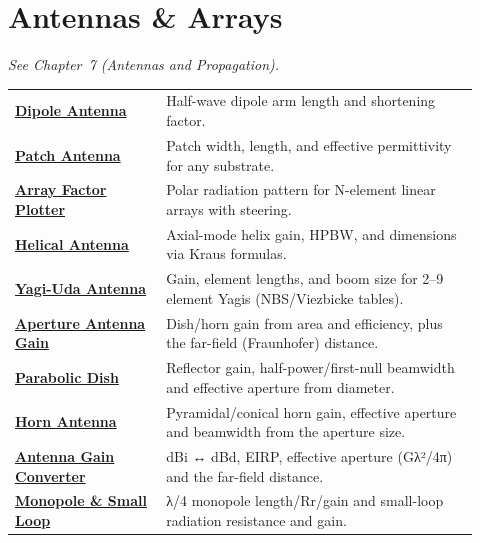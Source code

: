 \section*{Antennas \& Arrays}
\noindent\emph{See Chapter~7 (Antennas and Propagation).}
\begin{longtable}{>{\raggedright\arraybackslash}p{0.30\linewidth}>{\raggedright\arraybackslash}p{0.62\linewidth}}
\hline
\href{https://rftoolbox.ca/Dipole.html}{\textbf{Dipole Antenna}} & Half-wave dipole arm length and shortening factor. \\
\href{https://rftoolbox.ca/PatchAntenna.html}{\textbf{Patch Antenna}} & Patch width, length, and effective permittivity for any substrate. \\
\href{https://rftoolbox.ca/ArrayFactor.html}{\textbf{Array Factor Plotter}} & Polar radiation pattern for N-element linear arrays with steering. \\
\href{https://rftoolbox.ca/HelicalAntenna.html}{\textbf{Helical Antenna}} & Axial-mode helix gain, HPBW, and dimensions via Kraus formulas. \\
\href{https://rftoolbox.ca/YagiAntenna.html}{\textbf{Yagi-Uda Antenna}} & Gain, element lengths, and boom size for 2–9 element Yagis (NBS/Viezbicke tables). \\
\href{https://rftoolbox.ca/ApertureAntenna.html}{\textbf{Aperture Antenna Gain}} & Dish/horn gain from area and efficiency, plus the far-field (Fraunhofer) distance. \\
\href{https://rftoolbox.ca/ParabolicDish.html}{\textbf{Parabolic Dish}} & Reflector gain, half-power/first-null beamwidth and effective aperture from diameter. \\
\href{https://rftoolbox.ca/HornAntenna.html}{\textbf{Horn Antenna}} & Pyramidal/conical horn gain, effective aperture and beamwidth from the aperture size. \\
\href{https://rftoolbox.ca/AntennaGainConverter.html}{\textbf{Antenna Gain Converter}} & dBi ↔ dBd, EIRP, effective aperture (Gλ²/4π) and the far-field distance. \\
\href{https://rftoolbox.ca/MonopoleLoop.html}{\textbf{Monopole \& Small Loop}} & λ/4 monopole length/Rr/gain and small-loop radiation resistance and gain. \\
\hline
\end{longtable}

